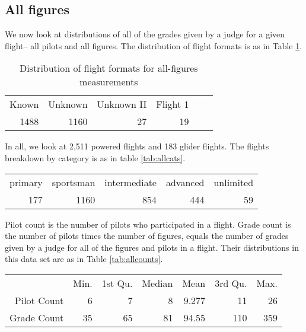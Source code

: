 \subsection{All figures}

We now look at distributions of all of the grades given by a judge for
a given flight-- all pilots and all figures.
The distribution of flight formats is as in Table \ref{tab:allformat}.

\begin{table}[htbp]
  \centering
  \begin{tabular}{r r r r r r}
  Known & Unknown & Unknown II & Flight 1 \\
  1488 & 1160 & 27 & 19 \\
  \end{tabular}
  \caption{Distribution of flight formats for all-figures measurements}
  \label{tab:allformat}
\end{table}

In all, we look at 2,511 powered flights and 183 glider flights. The flights
breakdown by category is as in table \ref{tab:allcats}.

\begin{table*}[tbp]
  \begin{tabular}{r r r r r}
  primary  & sportsman & intermediate  &  advanced  & unlimited  \\
      177  &      1160 &          854  &       444  &        59  \\
  \end{tabular}
  \caption{Distribution of categories for all-figures measurements}
  \label{tab:allcats}
\end{table*}

Pilot count is the number of pilots who participated in a flight.
Grade count is the number of pilots times the number of figures, equals
the number of grades given by a judge for all of the figures and pilots in
a flight. Their distributions in this data set are as in
Table \ref{tab:allcounts}.

\begin{table*}[tbp]
  \begin{tabular}{r | r r r r r r}
  & Min. & 1st Qu. & Median & Mean & 3rd Qu. & Max. \\
  Pilot Count &  6 &  7 &  8 & 9.277 &  11 &  26 \\
  Grade Count & 35 & 65 & 81 & 94.55 & 110 & 359 \\
  \end{tabular}
  \caption{Distribution of pilot and grade counts for all-figures measurements}
  \label{tab:allcounts}
\end{table*}

